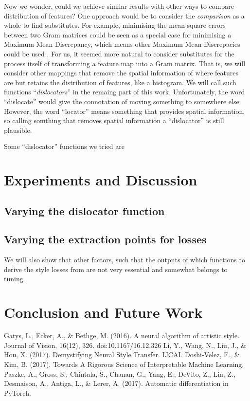\documentclass[runningheads]{llncs}
\begin{document}
Now we wonder, could we achieve similar results with other ways to compare 
distribution of features?
One approach would be to consider the \emph{comparison} as a whole to find 
substitutes. 
For example, minimising the mean square errors between two Gram matrices could be seen as 
a special case for minimising a Maximum Mean Discrepancy, which means other Maximum Mean Discrepacies
could be used \cite{MMD}.
For us, it seemed more natural to consider substitutes for the process itself of 
transforming a feature map into a Gram matrix. 
That is, we will consider other
mappings that remove the spatial information of where features are but retains
the distribution of features, like a histogram.
We will call such functions ``\emph{dislocators}'' in the remaing part of this work.
Unfortunately, the word ``dislocate'' would give the connotation of moving something to somewhere else.
However, the word ``locator'' means something that provides spatial information,
so calling somthing that removes spatial information a ``dislocator'' is still plausible.

Some ``dislocator'' functions we tried are


\section{Experiments and Discussion}

\subsection{Varying the dislocator function}

\subsection{Varying the extraction points for losses}

We will also show that other factors, such that the outputs of which functions to derive the style 
losses from are not very essential and somewhat belongs to tuning.

\section{Conclusion and Future Work}

\begin{thebibliography}{8}
Gatys, L., Ecker, A., \& Bethge, M. (2016). A neural algorithm of artistic style. Journal of Vision, 16(12), 326. doi:10.1167/16.12.326
Li, Y., Wang, N., Liu, J., \& Hou, X. (2017). Demystifying Neural Style Transfer. IJCAI.
Doshi-Velez, F., \& Kim, B. (2017). Towards A Rigorous Science of Interpretable Machine Learning.
Paszke, A., Gross, S., Chintala, S., Chanan, G., Yang, E., DeVito, Z., Lin, Z., Desmaison, A., Antiga, L., \& Lerer, A. (2017). Automatic differentiation in PyTorch.
\end{thebibliography}
\end{document}
